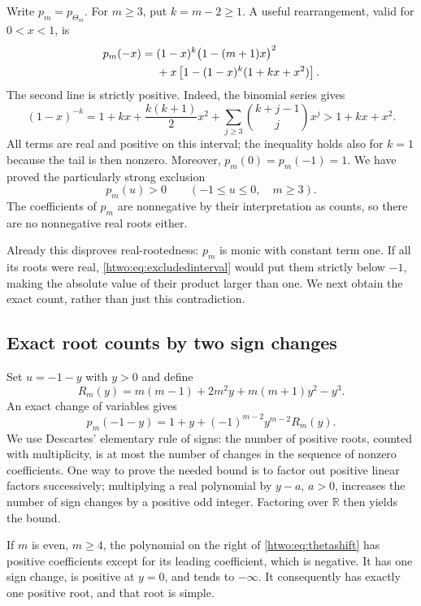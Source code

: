 \documentclass[11pt]{article}
\numberwithin{equation}{section}
\theoremstyle{definition}
\newcommand{\R}{\mathbb R}
\begin{document}
Write $p_m=p_{\Theta_m}$. For $m\ge3$, put $k=m-2\ge1$.
A useful rearrangement, valid for $0<x<1$, is
\begin{align}
 p_m(-x)={}&(1-x)^k\bigl(1-(m+1)x\bigr)^2\notag\\
 &+x\left[1-(1-x)^k(1+kx+x^2)\right].\label{htwo:eq:thetapositive}
\end{align}
The second line is strictly positive. Indeed, the binomial series gives
\[
 (1-x)^{-k}
 =1+kx+\frac{k(k+1)}2x^2+\sum_{j\ge3}\binom{k+j-1}{j}x^j
 >1+kx+x^2.
\]
All terms are real and positive on this interval; the inequality holds also
for $k=1$ because the tail is then nonzero. Moreover, $p_m(0)=p_m(-1)=1$.
We have proved the particularly strong exclusion
\begin{equation}
 p_m(u)>0\qquad(-1\le u\le0,\quad m\ge3).\label{htwo:eq:excludedinterval}
\end{equation}
The coefficients of $p_m$ are nonnegative by their interpretation as counts,
so there are no nonnegative real roots either.

Already this disproves real-rootedness: $p_m$ is monic with constant term
one. If all its roots were real, \eqref{htwo:eq:excludedinterval} would put them
strictly below $-1$, making the absolute value of their product larger than
one. We next obtain the exact count, rather than just this contradiction.

\subsection{Exact root counts by two sign changes}

Set $u=-1-y$ with $y>0$ and define
\[
 R_m(y)=m(m-1)+2m^2y+m(m+1)y^2-y^3.
\]
An exact change of variables gives
\begin{equation}
 p_m(-1-y)=1+y+(-1)^{m-2}y^{m-2}R_m(y).\label{htwo:eq:thetashift}
\end{equation}
We use Descartes' elementary rule of signs: the number of positive roots,
counted with multiplicity, is at most the number of changes in the sequence
of nonzero coefficients. One way to prove the needed bound is to factor
out positive linear factors successively; multiplying a real polynomial
by $y-a$, $a>0$, increases the number of sign changes by a positive odd
integer. Factoring over $\R$ then yields the bound.

If $m$ is even, $m\ge4$, the polynomial on the right of
\eqref{htwo:eq:thetashift} has positive coefficients except for its leading
coefficient, which is negative. It has one sign change, is positive at
$y=0$, and tends to $-\infty$. It consequently has exactly one positive
root, and that root is simple.
\end{document}
